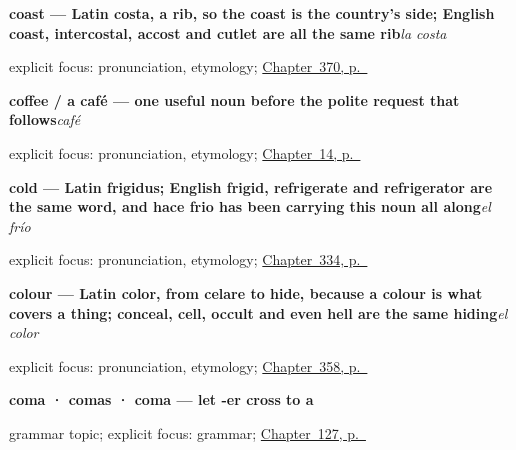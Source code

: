\noindent\begin{minipage}[t]{\linewidth}
\raggedright
\textbf{coast — Latin costa, a rib, so the coast is the country's side; English coast, intercostal, accost and cutlet are all the same rib}\enspace\emph{la costa}\par
\footnotesize explicit focus: pronunciation, etymology; \hyperref[ch:la-tormenta-y-el-trueno]{Chapter~370, p.~\pageref*{ch:la-tormenta-y-el-trueno}}
\end{minipage}\par\smallskip

\noindent\begin{minipage}[t]{\linewidth}
\raggedright
\textbf{coffee / a café — one useful noun before the polite request that follows}\enspace\emph{café}\par
\footnotesize explicit focus: pronunciation, etymology; \hyperref[ch:a-coffee]{Chapter~14, p.~\pageref*{ch:a-coffee}}
\end{minipage}\par\smallskip

\noindent\begin{minipage}[t]{\linewidth}
\raggedright
\textbf{cold — Latin frigidus; English frigid, refrigerate and refrigerator are the same word, and hace frio has been carrying this noun all along}\enspace\emph{el frío}\par
\footnotesize explicit focus: pronunciation, etymology; \hyperref[ch:salud-y-edad]{Chapter~334, p.~\pageref*{ch:salud-y-edad}}
\end{minipage}\par\smallskip

\noindent\begin{minipage}[t]{\linewidth}
\raggedright
\textbf{colour — Latin color, from celare to hide, because a colour is what covers a thing; conceal, cell, occult and even hell are the same hiding}\enspace\emph{el color}\par
\footnotesize explicit focus: pronunciation, etymology; \hyperref[ch:el-color-y-el-tamano]{Chapter~358, p.~\pageref*{ch:el-color-y-el-tamano}}
\end{minipage}\par\smallskip

\noindent\begin{minipage}[t]{\linewidth}
\raggedright
\textbf{coma · comas · coma — let -er cross to a}\par
\footnotesize grammar topic; explicit focus: grammar; \hyperref[ch:spanish-subjuntivo-regular]{Chapter~127, p.~\pageref*{ch:spanish-subjuntivo-regular}}
\end{minipage}\par\smallskip

